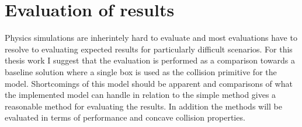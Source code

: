 \chapter{Evaluation of results}\label{cha:eval}
Physics simulations are inherintely hard to evaluate and most evaluations have to
resolve to evaluating expected results for particularly difficult scenarios.
For this thesis work I suggest that the evaluation is performed as a comparison
towards a baseline solution where a single box is used as the collision primitive
for the model. Shortcomings of this model should be apparent and comparisons of
what the implemented model can handle in relation to the simple method gives a
reasonable method for evaluating the results. In addition the methods will be
evaluated in terms of performance and concave collision properties.

 
